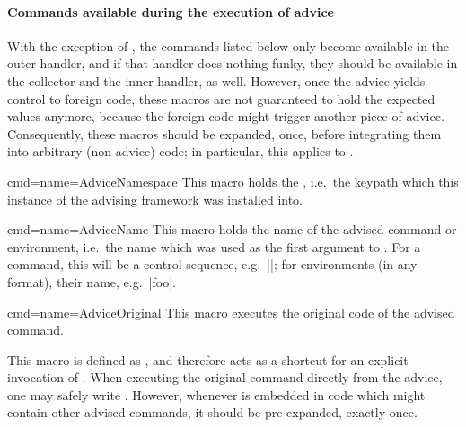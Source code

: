 \documentclass[a4paper,11pt]{article}
\begin{document}
\paragraph{Commands available during the execution of advice}

With the exception of , the commands listed below
only become available in the outer handler, and if that handler does nothing
funky, they should be available in the collector and the inner handler, as
well.  However, once the advice yields control to foreign code, these macros
are not guaranteed to hold the expected values anymore, because the foreign
code might trigger another piece of advice.  Consequently, these macros
should be expanded, once, before integrating them into arbitrary (non-advice)
code; in particular, this applies to .

\begin{doc}{cmd={name=AdviceNamespace}}
  This macro holds the , i.e.\ the keypath which this instance
  of the advising framework was installed into.
\end{doc}

\begin{doc}{cmd={name=AdviceName}}
  This macro holds the name of the advised command or environment, i.e.\ the
  name which was used as the first argument to .  For a command,
  this will be a control sequence, e.g.\ |\foo|; for environments (in any
   format), their name, e.g.\ |foo|.
\end{doc}


\begin{doc}{cmd={name=AdviceOriginal}}
  This macro executes the original code of the advised command.

  This macro is defined as ,
  and therefore acts as a shortcut for an explicit invocation of
  .  When executing the original command directly from
  the advice, one may safely write .  However, whenever
   is embedded in code which might contain other advised
  commands, it should be pre-expanded, exactly once.
\end{doc}
\end{document}
